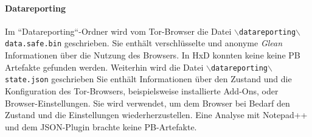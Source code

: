 \begin{appendices}
\paragraph*{Datareporting}
Im ``Datareporting``-Ordner wird vom Tor-Browser die Datei \texttt{$\backslash$datareporting$\backslash$\\data.safe.bin} geschrieben. Sie enthält verschlüsselte und anonyme \textit{Glean} Informationen über die Nutzung des Browsers. \cite{GitHub.05.06.2023b}
In HxD konnten keine keine PB Artefakte gefunden werden.
Weiterhin wird die Datei \texttt{$\backslash$datareporting$\backslash$state.json} geschrieben
Sie enthält Informationen über den Zustand und die Konfiguration des Tor-Browsers, beispielsweise installierte Add-Ons, oder Browser-Einstellungen. Sie wird verwendet, um dem Browser bei Bedarf den Zustand und die Einstellungen wiederherzustellen. \cite{GitHub.08.04.2019}
Eine Analyse mit Notepad++ und dem JSON-Plugin brachte keine PB-Artefakte.


\end{appendices}
